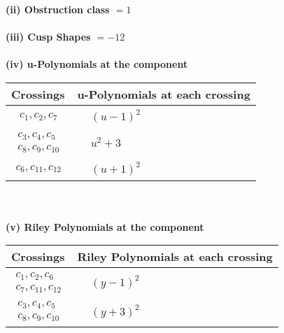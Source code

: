 \documentclass[1p]{elsarticle_modified}
\theoremstyle{definition}
\begin{document}
\flushleft \textbf{(ii) Obstruction class $= 1$}\\~\\
\flushleft \textbf{(iii) Cusp Shapes $= -12$}\\~\\
\newpage\renewcommand{\arraystretch}{1}
\flushleft \textbf{(iv) u-Polynomials at the component}\newline \\
\begin{tabular}{m{50pt}|m{274pt}}
Crossings & \hspace{64pt}u-Polynomials at each crossing \\
\hline $$\begin{aligned}c_{1},c_{2},c_{7}\end{aligned}$$&$\begin{aligned}
&(u-1)^2
\end{aligned}$\\
\hline $$\begin{aligned}c_{3},c_{4},c_{5}\\c_{8},c_{9},c_{10}\end{aligned}$$&$\begin{aligned}
&u^2+3
\end{aligned}$\\
\hline $$\begin{aligned}c_{6},c_{11},c_{12}\end{aligned}$$&$\begin{aligned}
&(u+1)^2
\end{aligned}$\\
\hline
\end{tabular}\\~\\
\newpage\renewcommand{\arraystretch}{1}
\flushleft \textbf{(v) Riley Polynomials at the component}\newline \\
\begin{tabular}{m{50pt}|m{274pt}}
Crossings & \hspace{64pt}Riley Polynomials at each crossing \\
\hline $$\begin{aligned}c_{1},c_{2},c_{6}\\c_{7},c_{11},c_{12}\end{aligned}$$&$\begin{aligned}
&(y-1)^2
\end{aligned}$\\
\hline $$\begin{aligned}c_{3},c_{4},c_{5}\\c_{8},c_{9},c_{10}\end{aligned}$$&$\begin{aligned}
&(y+3)^2
\end{aligned}$\\
\hline
\end{tabular}\\~\\
\end{document}
